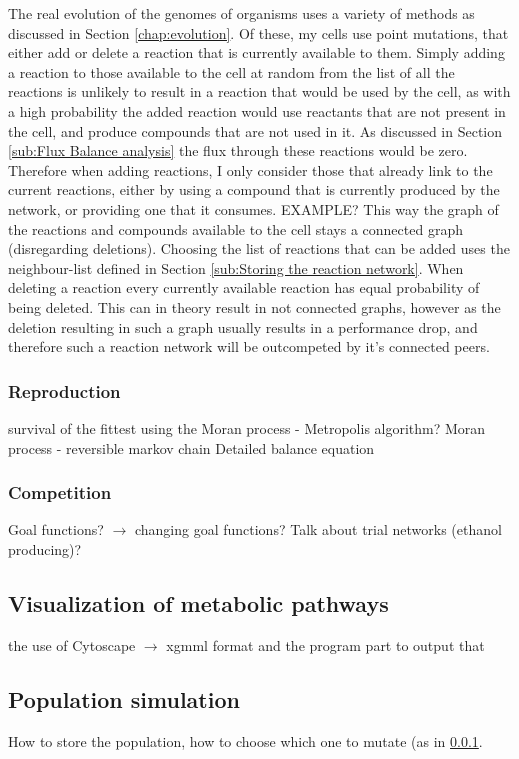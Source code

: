 \documentclass[10pt,a4paper]{article}
\begin{document}
	The real evolution of the genomes of organisms uses a variety of methods as discussed in Section \ref{chap:evolution}. Of these, my cells use point mutations, that either add or delete a reaction that is currently available to them. Simply adding a reaction to those available to the cell at random from the list of all the reactions is unlikely to result in a reaction that would be used by the cell, as with a high probability the added reaction would use reactants that are not present in the cell, and produce compounds that are not used in it. As discussed in Section \ref{sub:Flux Balance analysis} the flux through these reactions would be zero. Therefore when adding reactions, I only consider those that already link to the current reactions, either by using a compound that is currently produced by the network, or providing one that it consumes. EXAMPLE? This way the graph of the reactions and compounds available to the cell stays a connected graph (disregarding deletions). Choosing the list of reactions that can be added uses the neighbour-list defined in Section \ref{sub:Storing the reaction network}. When deleting a reaction every currently available reaction has equal probability of being deleted. This can in theory result in not connected graphs, however as the deletion resulting in such a graph usually results in a performance drop, and therefore such a reaction network will be outcompeted by it's connected peers. 
\subsubsection{Reproduction}
\label{ssub:Reproduction}
survival of the fittest using the Moran process - Metropolis algorithm?
Moran process - reversible markov chain
Detailed balance equation

\subsubsection{Competition}
\label{ssub:Competition}
Goal functions? $\rightarrow$ changing goal functions? Talk about trial networks (ethanol producing)?

\subsection{Visualization of metabolic pathways}
\label{sub:visualization}

the use of Cytoscape $\rightarrow$ xgmml format and the  program part to output that

\subsection{Population simulation}
\label{sub:population_simulation}
How to store the population, how to choose which one to mutate (as in \ref{ssub:Reproduction}. 
\end{document}
